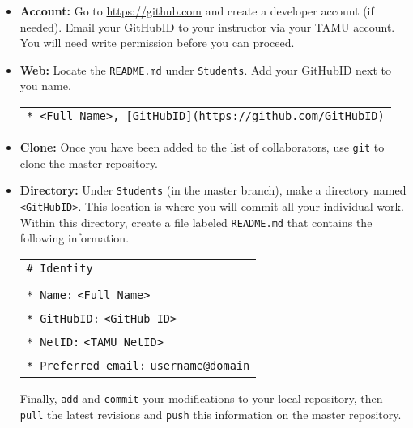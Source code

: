 \documentclass[letterpaper,11pt]{article}
\begin{document}
\begin{itemize}
\item \textbf{Account:} Go to \url{https://github.com} and create a developer account (if needed).
Email your GitHubID to your instructor via your TAMU account.
You will need write permission before you can proceed.
\item \textbf{Web:} Locate the \texttt{README.md} under \texttt{Students}.
Add your GitHubID next to you name.
\begin{center}
\begin{tabular}{l}
\texttt{* <Full Name>, [GitHubID](https://github.com/GitHubID)}
\end{tabular}
\end{center}
\item \textbf{Clone:} Once you have been added to the list of collaborators, use \texttt{git} to clone the master repository.
\item \textbf{Directory:} Under \texttt{Students} (in the master branch), make a directory named \texttt{<GitHubID>}.
This location is where you will commit all your individual work.
Within this directory, create a file labeled \texttt{README.md} that contains the following information.
\begin{center}
\begin{tabular}{l}
\texttt{\# Identity} \\
\\
\texttt{* Name:} \texttt{<Full Name>} \\
\texttt{* GitHubID:} \texttt{<GitHub ID>} \\
\texttt{* NetID:} \texttt{<TAMU NetID>} \\
\texttt{* Preferred email:} \texttt{username@domain} \\
\end{tabular}
\end{center}
Finally, \texttt{add} and \texttt{commit} your modifications to your local repository, then \texttt{pull} the latest revisions and \texttt{push} this information on the master repository.
\end{itemize}
\end{document}
